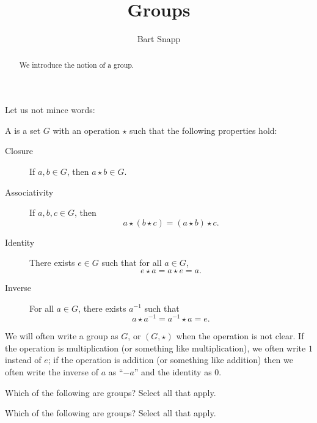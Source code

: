 \documentclass{ximera}
\author{Bart Snapp}
\title{Groups}
\begin{document}
\begin{abstract}
  We introduce the notion of a group.
\end{abstract}
\maketitle

Let us not mince words:

\begin{definition}
  A  is a set $G$ with an operation $\star$ such that the
  following properties hold:
  \begin{description}
  \item[Closure] If $a,b\in G$, then $a\star b\in G$.
  \item[Associativity] If $a,b,c\in G$, then
    \[
    a\star(b\star c)  = (a\star b)\star c.
    \]
  \item[Identity] There exists $e\in G$ such that for all $a\in G$, 
    \[
    e\star a = a \star e  = a.
    \]
  \item[Inverse] For all $a\in G$, there exists $a^{-1}$ such that
    \[
    a\star a^{-1} = a^{-1}\star a = e.
    \]
  \end{description}
  We will often write a group as $G$, or $(G,\star)$ when the
  operation is not clear. If the operation is multiplication (or
  something like multiplication), we often write $1$ instead of $e$;
  if the operation is addition (or something like addition) then we
  often write the inverse of $a$ as ``$-a$'' and the identity as $0$.
\end{definition}

\begin{exercise} %
  Which of the following are groups? Select all that apply.
  \begin{selectAll}
  \end{selectAll}
\end{exercise}

\begin{exercise} %
  Which of the following are groups? Select all that apply.
  \begin{selectAll}
  \end{selectAll}
\end{exercise}
\end{document}
